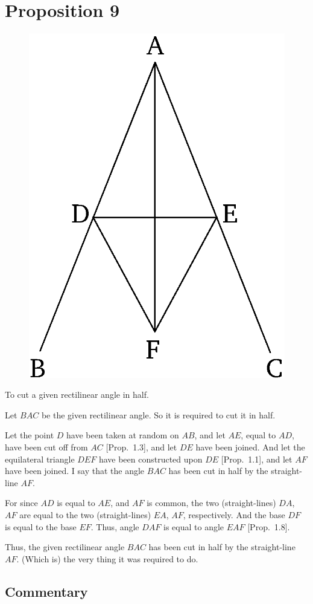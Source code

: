\chapter*{Proposition 9}
\label{prop:9}


\begin{figure}[ht]
    \begin{center}
    \includegraphics[width=0.5\linewidth]{figures/fig09e.eps}
    \label{fig:prop_9}
    \end{center}
\end{figure}

To cut a given rectilinear angle in half.

Let $BAC$ be the given rectilinear angle. So it is required to
cut it in half.

Let the point $D$ have been taken at random on $AB$,
and let $AE$, equal to $AD$,  have been cut off from $AC$  [Prop.~1.3], and
let $DE$ have been joined. And let the equilateral triangle $DEF$
have been constructed upon $DE$ [Prop.~1.1], and let $AF$ have been
joined. I say that the angle $BAC$ has been cut in half by the straight-line
$AF$.

For since $AD$ is equal to  $AE$, and $AF$ is common, the two (straight-lines) $DA$,
$AF$ are equal to the two (straight-lines) $EA$, $AF$, respectively. And the base $DF$
is equal to the base $EF$. Thus, angle $DAF$ is equal to angle $EAF$ [Prop.~1.8].

Thus, the given rectilinear angle $BAC$ has been cut in half by the
straight-line $AF$. (Which is) the very thing it was required to do.


\section*{Commentary}

